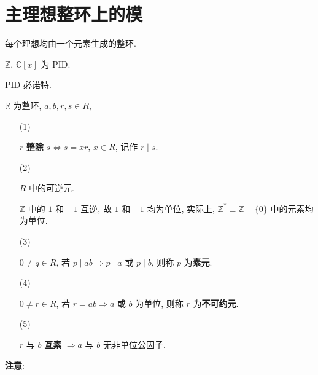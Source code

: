 \documentclass{note}
\begin{document}
\fi
\chapter{主理想整环上的模}
\begin{df}
    每个理想均由一个元素生成的整环.
\end{df}

\begin{eg}
    $\mathbb{Z}$, $\mathbb{C}[x]$ 为 PID.
\end{eg}

PID 必诺特.

$\mathbb{R}$ 为整环, $a,b,r,s\in R$,
\begin{itemize}
    \item[(1)] ~
    \begin{df}[整除]
        $r$ \textbf{整除} $s\Longleftrightarrow s=xr$, $x\in R$, 记作 $r\mid s$.
    \end{df}
    \item[(2)] ~
    \begin{df}[单位]
        $R$ 中的可逆元.
    \end{df}
    \begin{eg}
        $\mathbb{Z}$ 中的 $1$ 和 $-1$ 互逆, 故 $1$ 和 $-1$ 均为单位, 实际上, $\mathbb{Z}^*\equiv\mathbb{Z}-\{0\}$ 中的元素均为单位.
    \end{eg}
    \item[(3)] ~
    \begin{df}[素元]
        $0\neq q\in R$, 若 $p\mid ab\Longrightarrow p\mid a$ 或 $p\mid b$, 则称 $p$ 为\textbf{素元}.
    \end{df}
    \item[(4)] ~
    \begin{df}[不可约元]
        $0\neq r\in R$, 若 $r=ab\Longrightarrow a$ 或 $b$ 为单位, 则称 $r$ 为\textbf{不可约元}.
    \end{df}
    \item[(5)] ~
    \begin{df}[互素]
        $r$ 与 $b$ \textbf{互素} $\Longrightarrow a$ 与 $b$ 无非单位公因子.
    \end{df}
\end{itemize}
\textbf{注意}:
\end{document}
